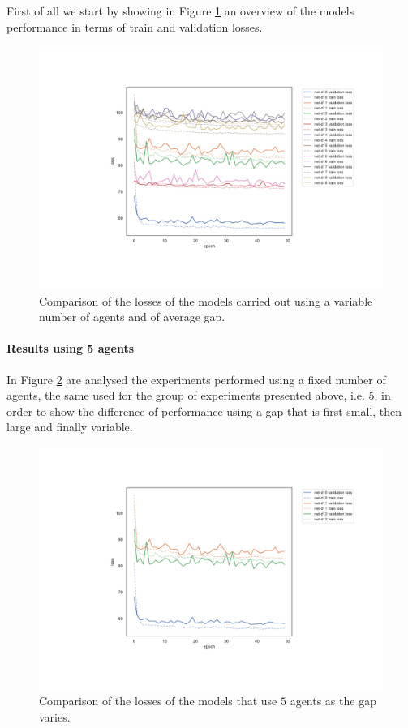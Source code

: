 First of all we start by showing in Figure \ref{fig:distlossext} an overview of the 
models performance in terms of train and validation losses. 
\begin{figure}[!htb]
	\centering
	\includegraphics[width=.8\textwidth]{contents/images/task1-extension/loss-distributed-all@}%
	\caption[Comparison of losses of the second set of 
	experiments.]{Comparison of the losses of the models carried out using a 
		variable number of agents and of average gap.}
	\label{fig:distlossext}
\end{figure}

\paragraph*{Results using 5 agents}
In Figure \ref{fig:distlossn5} are analysed the experiments performed using a 
fixed number of agents, the same used for the group of experiments presented 
above, i.e. $5$, in order to show the difference of performance using a gap that is 
first small, then large and finally variable.

\begin{figure}[!htb]
	\centering
	\includegraphics[width=.8\textwidth]{contents/images/task1-extension/loss-distributed-N5@}%
	\caption[Comparison of the losses of the models that use $5$ 
	agents.]{Comparison of the losses of the models that use $5$ agents as 
	the gap varies.}
	\label{fig:distlossn5}
\end{figure}

